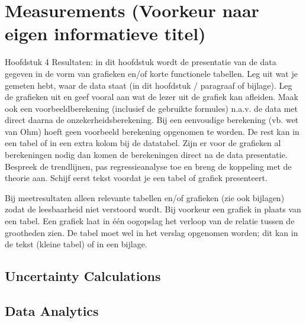 \chapter{Measurements (Voorkeur naar eigen informatieve titel)}

Hoofdstuk 4 Resultaten: in dit hoofdstuk wordt de presentatie van de data gegeven in de vorm van grafieken en/of korte functionele tabellen. Leg uit wat je gemeten hebt, waar de data staat (in dit hoofdstuk / paragraaf of bijlage). Leg de grafieken uit en geef vooral aan wat de lezer uit de grafiek kan afleiden. Maak ook een voorbeeldberekening (inclusief de gebruikte formules) n.a.v. de data met direct daarna de onzekerheidsberekening. Bij een eenvoudige berekening (vb. wet van Ohm) hoeft geen voorbeeld berekening opgenomen te worden. De rest kan in een tabel of in een extra kolom bij de datatabel. Zijn er voor de grafieken al berekeningen nodig dan komen de berekeningen direct na de data presentatie. Bespreek de trendlijnen, pas regressieanalyse toe en breng de koppeling met de theorie aan. Schijf eerst tekst voordat je een tabel of grafiek presenteert.

Bij meetresultaten alleen relevante tabellen en/of grafieken (zie ook bijlagen) zodat de leesbaarheid niet verstoord wordt. Bij voorkeur een grafiek in plaats van een tabel. Een grafiek laat in één oogopslag het verloop van de relatie tussen de grootheden zien. De tabel moet wel in het verslag opgenomen worden; dit kan in de tekst (kleine tabel) of in een bijlage.

\section{Uncertainty Calculations}

\section{Data Analytics}